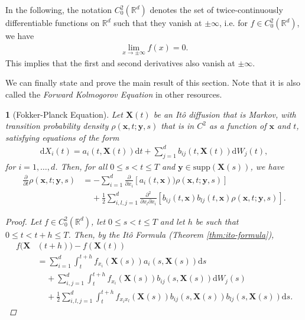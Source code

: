 \documentclass[english]{article}
\numberwithin{equation}{section}
\numberwithin{figure}{section}
\theoremstyle{bolddescit}
\newtheorem{theorem}{\protect\theoremname}[section]
\theoremstyle{definition}
\theoremstyle{definition}
\theoremstyle{plain}
\theoremstyle{plain}
\theoremstyle{bolddesc}
\theoremstyle{plain}
\theoremstyle{remark}
\providecommand{\theoremname}{Theorem}
\begin{document}
In the following, the notation $C^2_0(\mathbb{R}^d)$ denotes the set of twice-continuously differentiable functions on $\mathbb{R}^d$ such that they vanish at $\pm \infty$, i.e. for $f \in C^2_0(\mathbb{R}^d)$, we have
\begin{align*}
  \lim_{x \to \pm \infty} f(x) = 0.
\end{align*}
This implies that the first and second derivatives also vanish at $\pm \infty$.

We can finally state and prove the main result of this section. Note that it is also called the \textit{Forward Kolmogorov Equation} in other resources.

\begin{theorem}[Fokker-Planck Equation]\label{thm:fokker-planck}
  Let $\mathbf{X}(t)$ be an It\^o diffusion that is Markov, with transition probability density $\rho(\mathbf{x},t;\mathbf{y},s)$ that is in $C^2$ as a function of $\mathbf{x}$ and $t$, satisfying equations of the form
  \begin{align*}
    \mathrm{d}X_i(t) = a_i(t, \mathbf{X}(t)) \mathrm{d}t + \sum_{j=1}^d b_{ij}(t, \mathbf{X}(t)) \mathrm{d}W_j(t),
  \end{align*}
  for $i=1,\ldots,d$. Then, for all $0 \le s < t \le T$ and $\mathbf{y} \in \mathrm{supp}(\mathbf{X}(s))$, we have
  \begin{align*}
    \frac{\partial}{\partial t}\rho(\mathbf{x},t;\mathbf{y},s)
    &= - \sum_{i=1}^d \frac{\partial}{\partial x_i}[a_i(t,\mathbf{x}))\rho(\mathbf{x},t;\mathbf{y},s)]\\
      &\ \ \ \ \ + \frac{1}{2} \sum_{i,l,j=1}^{d} \frac{\partial^2}{\partial x_l \partial x_i}[b_{ij}(t,\mathbf{x}) b_{lj}(t,\mathbf{x}) \rho(\mathbf{x},t;\mathbf{y},s)].
  \end{align*}

  \begin{proof}
    Let $f \in C^2_0(\mathbb{R}^d)$, let $0 \le s < t \le T$ and let $h$ be such that $0 \le t < t + h \le T$. Then, by the It\^o Formula (Theorem \ref{thm:ito-formula}),
    \begin{align*}
      f(\mathbf{X}&(t+h)) - f(\mathbf{X}(t))\\
      &= \sum_{i=1}^{d} \int_t^{t+h} f_{x_i}(\mathbf{X}(s)) a_i(s,\mathbf{X}(s)) \mathrm{d}s\\
        &\ \ \ \ \ + \sum_{i,j=1}^{d} \int_t^{t+h} f_{x_i}(\mathbf{X}(s)) b_{ij}(s,\mathbf{X}(s)) \mathrm{d}W_j(s)\\
        &\ \ \ \ \ + \frac{1}{2} \sum_{i,l,j=1}^{d} \int_t^{t+h} f_{x_i x_l}(\mathbf{X}(s)) b_{ij}(s,\mathbf{X}(s)) b_{lj}(s,\mathbf{X}(s)) \mathrm{d}s.
    \end{align*}


\end{proof}
\end{theorem}
\end{document}
